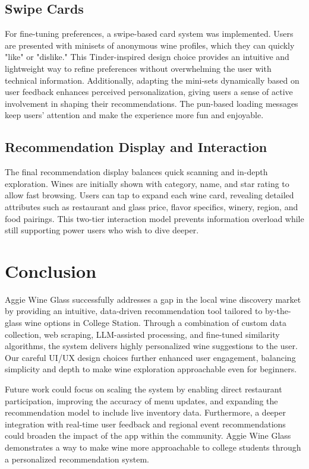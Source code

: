 \documentclass{article} %
\begin{document}
\subsection{Swipe Cards}

For fine-tuning preferences, a swipe-based card system was implemented. Users are presented with minisets of anonymous wine profiles, which they can quickly "like" or "dislike." This Tinder-inspired design choice provides an intuitive and lightweight way to refine preferences without overwhelming the user with technical information. Additionally, adapting the mini-sets dynamically based on user feedback enhances perceived personalization, giving users a sense of active involvement in shaping their recommendations. The pun-based loading messages keep users’ attention and make the experience more fun and enjoyable.

\subsection{Recommendation Display and Interaction}

The final recommendation display balances quick scanning and in-depth exploration. Wines are initially shown with category, name, and star rating to allow fast browsing. Users can tap to expand each wine card, revealing detailed attributes such as restaurant and glass price, flavor specifics, winery, region, and food pairings. This two-tier interaction model prevents information overload while still supporting power users who wish to dive deeper. 

\section{Conclusion}
Aggie Wine Glass successfully addresses a gap in the local wine discovery market by providing an intuitive, data-driven recommendation tool tailored to by-the-glass wine options in College Station. Through a combination of custom data collection, web scraping, LLM-assisted processing, and fine-tuned similarity algorithms, the system delivers highly personalized wine suggestions to the user. Our careful UI/UX design choices further enhanced user engagement, balancing simplicity and depth to make wine exploration approachable even for beginners.

Future work could focus on scaling the system by enabling direct restaurant participation, improving the accuracy of menu updates, and expanding the recommendation model to include live inventory data. Furthermore, a deeper integration with real-time user feedback and regional event recommendations could broaden the impact of the app within the community. Aggie Wine Glass demonstrates a way to make wine more approachable to college students through a personalized recommendation system.
\end{document}

